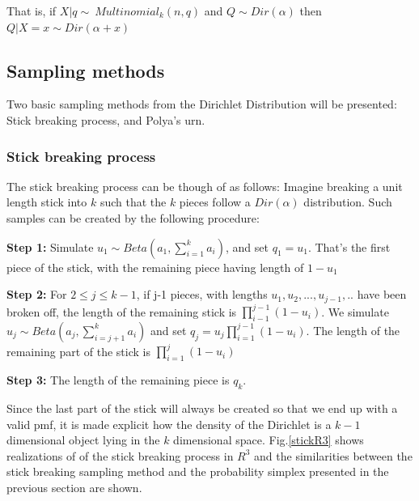 \documentclass[twoside,hidelinks]{article}
\begin{document}
That is,  if $ X|q \sim\ Multinomial_k(n,q) $ and $ Q \sim Dir( \alpha ) $ then $ Q| X=x \sim Dir( \alpha + x) $

\subsection{Sampling methods}

Two basic sampling methods from the Dirichlet Distribution will be presented: Stick breaking process, and Polya's urn.

\subsubsection{Stick breaking process}

The stick breaking process can be though of as follows: Imagine breaking a unit length stick into $k$ such that the $k$ pieces follow a $Dir( \alpha)$  distribution. Such samples can be created by the following procedure:
\begin{compactitem}
	\item  \textbf{Step 1:} Simulate $ u_1 \sim Beta(a_1, \sum_{i=1}^k a_i ) $, and set $q_1 = u_1$. That's the first piece of the stick, with the remaining piece having length of $ 1-u_1$
	\item \textbf{Step 2:} For $ 2 \leq j \leq k-1$, if j-1 pieces, with lengths  $u_1,u_2,...,u_{j-1},..$ have been broken off, the length of the remaining stick is $\prod_{i-1}^{j-1} (1 - u_i) $. We simulate $ u_j \sim Beta( a_j, \sum_{i=j+1}^k a_i) $ and set  $q_j=u_j \prod_{i=1}^{j-1}(1-u_i)$. The length of the remaining part of the stick is  $\prod_{i=1}^{j}(1-u_i)$
	\item  \textbf{Step 3:} The length of the remaining piece is $q_k$.


\end{compactitem}
Since the last part of the stick will always be created so that we end up with a valid pmf, it is made explicit how the density of the Dirichlet is  a ${k-1}$ dimensional object lying in the $k$ dimensional space. Fig.\ref{stickR3} shows realizations of of the stick breaking process in $R^3$ and the similarities between the stick breaking sampling method and the probability simplex presented in the previous section are shown.
\end{document}
